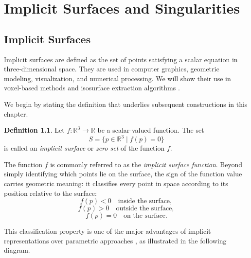 \documentclass[12pt, a4paper, oneside]{book}
\theoremstyle{plain}
\theoremstyle{definition}
\newtheorem{definition}[theorem]{Definition}
\theoremstyle{remark}
\theoremstyle{definition}
\begin{document}


\newpage
\chapter{Implicit Surfaces and Singularities}


\section{Implicit Surfaces}
Implicit surfaces are defined as the set of points satisfying a scalar equation in
three-dimensional space. They are used in computer graphics, geometric modeling,
visualization, and numerical processing. We will show their use in voxel-based methods
and isosurface extraction algorithms \cite{bloomenthal2000implicit}.

We begin by stating the definition that underlies subsequent constructions in this chapter.

\begin{definition}
Let $f : \mathbb{R}^3 \to \mathbb{R}$ be a scalar-valued function. The set
\[
S = \{ p \in \mathbb{R}^3 \mid f(p) = 0 \}
\]
is called an \emph{implicit surface} or \emph{zero set} of the function $f$.
\end{definition}

The function $f$ is commonly referred to as the \emph{implicit surface function}. Beyond
simply identifying which points lie on the surface, the sign of the function value carries
geometric meaning: it classifies every point in space according to its position relative
to the surface:
\[
f(p) < 0 \quad \text{inside the surface},
\]
\[
f(p) > 0 \quad \text{outside the surface},
\]
\[
f(p) = 0 \quad \text{on the surface}.
\]

This classification property is one of the major advantages of implicit representations
over parametric approaches \cite{bloomenthal2000implicit}, as illustrated in the
following diagram.

\begin{center}
\end{center}
\end{document}

